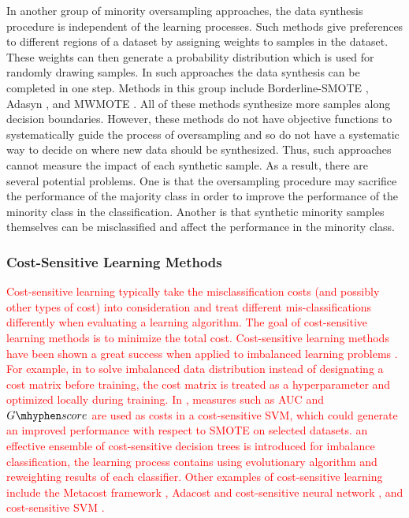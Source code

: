 \documentclass[10pt,journal,compsoc]{IEEEtran}
\newcommand\gscore{\mathop{G\mhyphen score}}
\begin{document}
In another group of minority oversampling approaches, the data synthesis procedure is independent of the learning processes. Such methods give preferences to different regions of a dataset by assigning weights to samples in the dataset. These weights can then generate a probability distribution which is used for randomly drawing samples. In such approaches the data synthesis can be completed in one step. Methods in this group include Borderline-SMOTE \cite{HH:05}, Adasyn \cite{HH:08}, \cite{barua2011novel} and MWMOTE \cite{barua2014mwmote}. All of these methods synthesize more samples along decision boundaries. However, these methods do not have objective functions to systematically guide the process of oversampling and so do not have a systematic way to decide on where new data should be synthesized. Thus, such approaches cannot measure the impact of each synthetic sample. As a result, there are several potential problems. One is that the oversampling procedure may sacrifice the performance of the majority class in order to improve the performance of the minority class in the classification. Another is that synthetic minority samples themselves can be misclassified and affect the performance in the minority class.

\subsubsection{Cost-Sensitive Learning Methods}
\textcolor{red}{Cost-sensitive learning typically take the misclassification costs (and possibly other types of cost) into consideration and treat different mis-classifications differently when evaluating a learning algorithm. The goal of cost-sensitive learning methods is to minimize the total cost. Cost-sensitive learning methods have been shown a great success when applied to imbalanced learning problems \cite{he2013imbalanced}. For example, in \cite{thai2010cost} to solve imbalanced data distribution instead of designating a cost matrix before training, the cost matrix is treated as a hyperparameter and optimized locally during training. In \cite{cao2013optimized}, measures such as AUC and $\gscore$ are used as costs in a cost-sensitive SVM, which could generate an improved performance with respect to SMOTE on selected datasets. \cite{krawczyk2014cost} an effective ensemble of cost-sensitive decision trees is introduced for imbalance classification, the learning process contains using evolutionary algorithm and reweighting results of each classifier. Other examples of cost-sensitive learning include the Metacost framework \cite{domingos1999metacost}, Adacost \cite{Fan:1999:AMC:645528.657651} and cost-sensitive neural network \cite{zhou2006training}, and cost-sensitive SVM \cite{wang2012applying}.}
\end{document}
